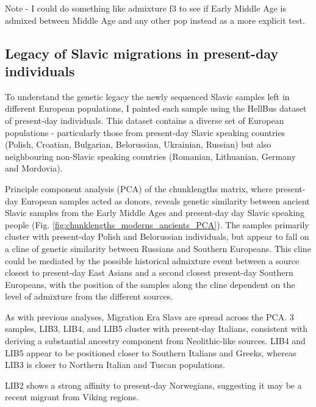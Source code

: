 Note - I could do something like admixture f3 to see if Early Middle Age is admixed between Middle Age and any other pop instead as a more explicit test.

\subsection{Legacy of Slavic migrations in present-day individuals}

To understand the genetic legacy the newly sequenced Slavic samples left in different European populations, I painted each sample using the HellBus dataset of present-day individuals. This dataset contains a diverse set of European populations - particularly those from present-day Slavic speaking countries (Polish, Croatian, Bulgarian, Belorussian, Ukrainian, Russian) but also neighbouring non-Slavic speaking countries (Romanian, Lithuanian, Germany and Mordovia).  

Principle component analysis (PCA) of the chunklengths matrix, where present-day European samples acted as donors, reveals genetic similarity between ancient Slavic samples from the Early Middle Ages and present-day day Slavic speaking people (Fig. \ref{fig:chunklengths_moderns_ancients_PCA}). The samples primarily cluster with present-day Polish and Belorussian individuals, but appear to fall on a cline of genetic similarity between Russians and Southern Europeans. This cline could be mediated by the possible historical admixture event between a source closest to present-day East Asians and a second closest present-day Southern Europeans, with the position of the samples along the cline dependent on the level of admixture from the different sources.

As with previous analyses, Migration Era Slavs are spread across the PCA. 3 samples, LIB3, LIB4, and LIB5 cluster with present-day Italians, consistent with deriving a substantial ancestry component from Neolithic-like sources. LIB4 and LIB5 appear to be positioned closer to Southern Italians and Greeks, whereas LIB3 is closer to Northern Italian and Tuscan populations. 

LIB2 shows a strong affinity to present-day Norwegians, suggesting it may be a recent migrant from Viking regions. 

